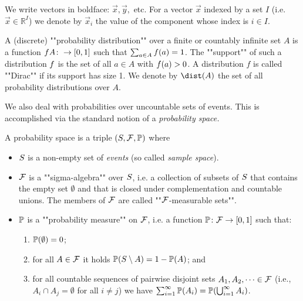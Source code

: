 We write vectors in boldface: $ \vec{x}, \vec{y}, $ etc. For a vector $ \vec{x} $ indexed by a set $ I $ (i.e. $ \vec{x}\in \mathbb{R}^I $) we denote by $ \vec{x}_i $ the value of the component whose index is  $i\in I  $. 

A (discrete) ""probability distribution"" over a finite or countably infinite set $A$ is a function $f A \colon \rightarrow [0,1]$ such that $\sum_{a\in A}f(a)=1$. The ""support"" of such a distribution $f$ is the set of all $a\in A$ with $f(a)>0$. A distribution $f$ is called ""Dirac"" if its support has size 1.
We denote by $\dist(A)$ the set of all probability distributions over $A$.


We also deal with probabilities over uncountable sets of events. This is accomplished via the standard notion of a \emph{probability space.}

\begin{definition}
\label{5-def:probspace}
A probability space is a triple
$(S,\mathcal{F},\mathbb{P})$ where
\begin{itemize}
\item $S$ is a non-empty set of \emph{events} (so called
\emph{sample space}). 

\item $\mathcal{F}$ is a ""sigma-algebra"" over $S$,
i.e. a collection of subsets of $S$ that contains the empty set
$\emptyset$ and that is closed under complementation and countable unions. The members of $\mathcal{F}$ are called ""$\mathcal{F}$-measurable 
sets"".

\item $\mathbb{P}$ is a ""probability measure"" on $\mathcal{F}$, i.e. a function
$\mathbb{P}\colon \mathcal{F}\rightarrow[0,1]$ such that:
\begin{enumerate}
\item $\mathbb{P}(\emptyset)=0$;

\item for all $A\in \mathcal{F}$ it holds $\mathbb{P}(S \setminus
A)=1-\mathbb{P}(A)$; and

\item for all countable sequences of pairwise disjoint sets $A_1,A_2,\dots \in \mathcal{F}$ (i.e., $A_i \cap A_j = \emptyset$ for all $i\neq j$)
we have $\sum_{i=1}^{\infty}\mathbb{P}(A_i)=\mathbb{P}(\bigcup_{i=1}^{\infty} A_i)$.
\end{enumerate}
\end{itemize}
\end{definition}

